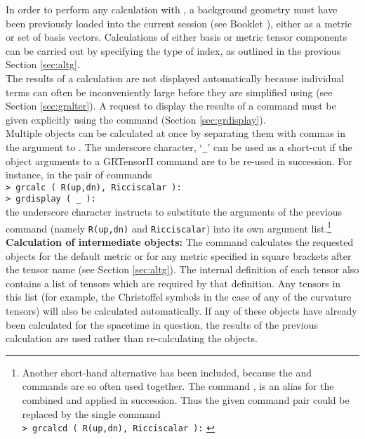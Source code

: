\documentclass{article}
\begin{document}
In order to perform any calculation with , a background
geometry must have been previously loaded into the current session
(see Booklet \grMakegRef), either as a metric or set of basis
vectors. Calculations of either basis or metric tensor components can
be carried out by specifying the type of index, as outlined in the
previous Section \ref{sec:altg}.\\

The results of a calculation are not displayed automatically because
individual terms can often be inconveniently large before they are
simplified using  (see Section \ref{sec:gralter}). A
request to display the results of a  command must be
given explicitly using the command  (Section 
\ref{sec:grdisplay}).\\

Multiple objects can be calculated at once by separating them with
commas in the argument to . The underscore character,
`\texttt{\_}' can be used as a short-cut if the object arguments to
a GRTensorII command are to be re-used in succession. For instance,
in the pair of commands\\

\noindent\texttt{> grcalc ( R(up,dn), Ricciscalar ):} \\
\texttt{> grdisplay ( \_ ):} \\

\noindent the underscore character instructs  to
substitute the arguments of the previous  command
(namely \texttt{R(up,dn)} and \texttt{Ricciscalar}) into its own
argument list.\footnote{Another short-hand alternative has been
included, because the  and  commands
are so often used together.  The command , is an alias
for the combined  and  applied in
succession. Thus the given command pair could be replaced by the
single command\\

\noindent\texttt{> grcalcd ( R(up,dn), Ricciscalar ):}
\label{spec:grcalcd}}\\

\noindent\textbf{Calculation of intermediate objects:}
The  command calculates the requested objects for the
default metric or for any metric specified in square brackets
after the tensor name (see Section \ref{sec:altg}). The internal
definition of each tensor also contains a list of tensors which
are required by that definition. Any tensors in this list (for
example, the Christoffel symbols in the case of any of the
curvature tensors) will also be calculated automatically. If any of
these objects have already been calculated for the spacetime in
question, the results of the previous calculation are used rather
than re-calculating the objects.\\
\end{document}
